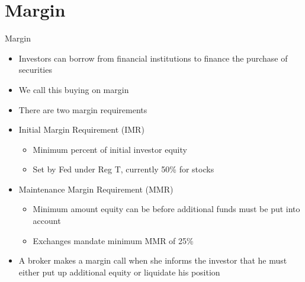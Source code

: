 \documentclass{beamer}
\begin{document}
\section{Margin}
\begin{frame}{Margin}
\begin{itemize}
\item Investors can borrow from financial institutions to finance the purchase of securities
\item We call this buying on margin
\item There are two margin requirements
\item [1.] Initial Margin Requirement (IMR)
\begin{itemize}
\item Minimum percent of initial investor equity
\item Set by Fed under Reg T, currently 50\% for stocks
\end{itemize}
\item [2.] Maintenance Margin Requirement (MMR)
\begin{itemize}
\item Minimum amount equity can be before additional funds must be put into account
\item Exchanges mandate minimum MMR of 25\%
\end{itemize}
\item A broker makes a margin call when she informs the investor that he must either put up additional equity or liquidate his position
\end{itemize}
\end{frame}
\end{document}
